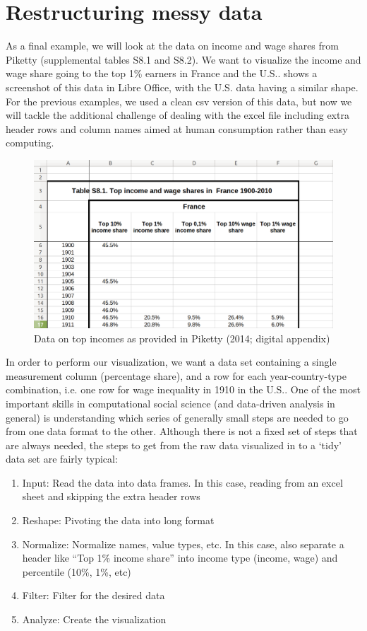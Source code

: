 \section{Restructuring messy data}

As a final example, we will look at the data on income and wage shares from Piketty (supplemental tables S8.1 and S8.2).
We want to visualize the income and wage share going to the top 1\% earners in France and the U.S..
 shows a screenshot of this data in Libre Office, with the U.S. data having a similar shape.
For the previous examples, we used a clean csv version of this data, but now we will tackle the additional challenge
of dealing with the excel file including extra header rows and column names aimed at human consumption rather than easy computing. 

\begin{figure}
  \includegraphics[width=\linewidth]{chapter07/messy.png}
  \caption{Data on top incomes as provided in Piketty (2014; digital appendix)}\label{fig:messy}
\end{figure}

In order to perform our visualization, we want a data set containing a single measurement column (percentage share),
and a row for each year-country-type combination, i.e. one row for wage inequality in 1910 in the U.S..
One of the most important skills in computational social science (and data-driven analysis in general) is
understanding which series of generally small steps are needed to go from one data format to the other.
Although there is not a fixed set of steps that are always needed, the steps to get from the raw data visualized in  to a `tidy' data set are fairly typical:

\begin{enumerate}
  \item Input: Read the data into data frames. In this case, reading from an excel sheet and skipping the extra header rows
  \item Reshape: Pivoting the data into long format
  \item Normalize: Normalize names, value types, etc. In this case, also separate a header like ``Top 1\% income share'' into income type (income, wage) and percentile (10\%, 1\%, etc)
  \item Filter: Filter for the desired data
  \item Analyze: Create the visualization
\end{enumerate}

